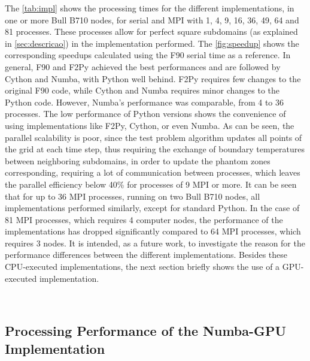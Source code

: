 \documentclass[12pt]{article}
\begin{document}
The \autoref{tab:impl} shows the processing times for the different implementations, in one or more Bull B710 nodes, for serial and MPI with 1, 4, 9, 16, 36, 49, 64 and 81 processes. 
These processes allow for perfect square subdomains (as explained in \autoref{sec:descricao}) in the implementation performed.
The \autoref{fig:speedup} shows the corresponding speedups calculated using the F90 serial time as a reference. In general, F90 and F2Py achieved the best performances and are followed by Cython and Numba, with Python well behind. F2Py requires few changes to the original F90 code, while Cython and Numba requires minor changes to the Python code. However, Numba's performance was comparable, from 4 to 36 processes. The low performance of Python versions shows the convenience of using implementations like F2Py, Cython, or even Numba. As can be seen, the parallel scalability is poor, since the test problem algorithm updates all points of the grid at each time step, thus requiring the exchange of boundary temperatures between neighboring subdomains, in order to update the phantom zones corresponding, requiring a lot of communication between processes, which leaves the parallel efficiency below 40\% for processes of 9 MPI or more. It can be seen that for up to 36 MPI processes, running on two Bull B710 nodes, all implementations performed similarly, except for standard Python. In the case of 81 MPI processes, which requires 4 computer nodes, the performance of the implementations has dropped significantly compared to 64 MPI processes, which requires 3 nodes. It is intended, as a future work, to investigate the reason for the performance differences between the different implementations. Besides these CPU-executed implementations, the next section briefly shows the use of a GPU-executed implementation.




\
\subsection{Processing Performance of the Numba-GPU Implementation}
\label{ssec:gpuexec}
\end{document}
